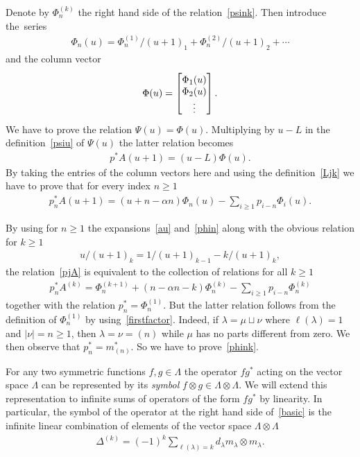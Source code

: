\documentclass[pdftex]{sigma}
\numberwithin{equation}{section}
\renewcommand\ge{\geqslant}
\begin{document}
Denote by $\Phi^{(k)}_n$ the right hand side of the relation~\eqref{psink}.
Then introduce the~series
\begin{gather}
\label{phin}
\Phi_n(u)=\Phi^{(1)}_n/(u+1)_1+\Phi^{(2)}_n/
(u+1)_2+\cdots
\end{gather}
and the column vector
\begin{gather*}
\Phi(u)=
\begin{bmatrix}
\raisebox{0pt}[12pt][0pt]{$\Phi_1(u)$}
\\
\Phi_2(u)
\\
\vdots
\end{bmatrix}
.
\end{gather*}
We have to prove the relation $\Psi(u)=\Phi(u)$.
Multiplying by $u-L$ in the def\/inition~\eqref{psiu} of $\Psi(u)$ the latter relation becomes
\begin{gather*}
p^{\ast}A(u+1)=(u-L)\Phi(u).
\end{gather*}
By taking the entries of the column vectors here and using the def\/inition~\eqref{Ljk} we have to prove
that for every index $n\ge1$
\begin{gather}
\label{pjA}
p^{\ast}_nA(u+1)=(u+n-\alpha n)\Phi_n(u)-\sum_{i\ge1}
p_{i-n}\Phi_i(u).
\end{gather}

By using for $n\ge1$ the expansions~\eqref{au} and~\eqref{phin} along with the obvious relation for $k\ge1$
\begin{gather*}
u/(u+1)_k=1/(u+1)_{k-1}-k/(u+1)_k,
\end{gather*}
the relation~\eqref{pjA} is equivalent to the collection of relations for all $k\ge1$
\begin{gather}
\label{phink}
p^{\ast}_nA^{(k)}=\Phi^{(k+1)}_n+(
n-\alpha n-k)\Phi^{(k)}_n-\sum_{i\ge1}
p_{i-n}\Phi^{(k)}_n
\end{gather}
together with the relation $p^{\ast}_n=\Phi^{(1)}_n$.
But the latter relation follows from the def\/inition of $\Phi^{(1)}_n$ by
using~\eqref{firstfactor}.
Indeed, if $\lambda=\mu\sqcup\nu$ where $\ell(\lambda)=1$ and $|\nu|=n\ge1$, then $\lambda=\nu=(n)$ while
$\mu$ has no parts dif\/ferent from zero.
We then observe that $p_n^{\ast}=m_{(n)}^{\ast}$.
So we have to prove~\eqref{phink}.

For any two symmetric functions $f,g\in\Lambda$ the operator $f g^{\ast}$
acting on the vector space $\Lambda$ can be represented by its \emph{symbol} $f\otimes
g\in\Lambda\otimes\Lambda$.
We will extend this representation to inf\/inite sums of operators of the form $f
g^{\ast}$ by linearity.
In particular, the symbol of the operator at the right hand side of~\eqref{basic} is the inf\/inite linear
combination of elements of the vector space $\Lambda\otimes\Lambda$
\begin{gather}
\label{dek}
\Delta^{(k)}=(-1)^k\sum_{\ell(\lambda)=k}d_\lambda m_\lambda\otimes m_\lambda.
\end{gather}
\end{document}
